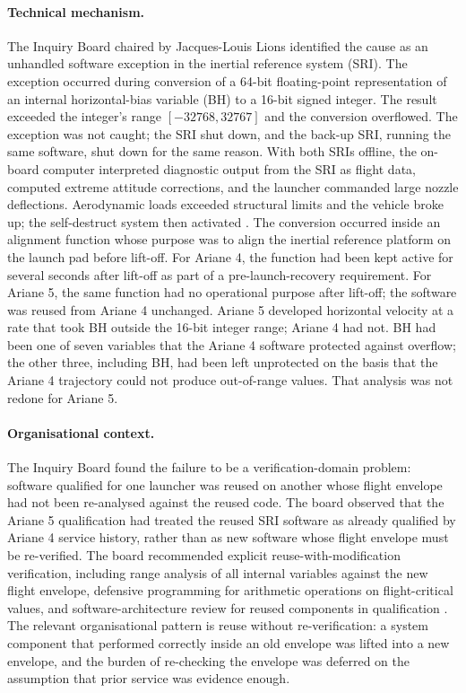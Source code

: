\paragraph{Technical mechanism.}
The Inquiry Board chaired by Jacques-Louis Lions identified the
cause as an unhandled software exception in the inertial reference
system (SRI). The exception occurred during conversion of a 64-bit
floating-point representation of an internal horizontal-bias
variable (BH) to a 16-bit signed integer. The result exceeded the
integer's range $[-32768, 32767]$ and the conversion overflowed. The
exception was not caught; the SRI shut down, and the back-up SRI,
running the same software, shut down for the same reason. With both
SRIs offline, the on-board computer interpreted diagnostic output
from the SRI as flight data, computed extreme attitude corrections,
and the launcher commanded large nozzle deflections. Aerodynamic
loads exceeded structural limits and the vehicle broke up; the
self-destruct system then activated \cite{acc:ariane501-ifr}. The
conversion occurred inside an alignment function whose purpose was
to align the inertial reference platform on the launch pad before
lift-off. For Ariane 4, the function had been kept active for
several seconds after lift-off as part of a pre-launch-recovery
requirement. For Ariane 5, the same function had no operational
purpose after lift-off; the software was reused from Ariane 4
unchanged. Ariane 5 developed horizontal velocity at a rate that
took BH outside the 16-bit integer range; Ariane 4 had not. BH had
been one of seven variables that the Ariane 4 software protected
against overflow; the other three, including BH, had been left
unprotected on the basis that the Ariane 4 trajectory could not
produce out-of-range values. That analysis was not redone for Ariane
5.

\paragraph{Organisational context.}
The Inquiry Board found the failure to be a verification-domain
problem: software qualified for one launcher was reused on another
whose flight envelope had not been re-analysed against the reused
code. The board observed that the Ariane 5 qualification had treated
the reused SRI software as already qualified by Ariane 4 service
history, rather than as new software whose flight envelope must be
re-verified. The board recommended explicit reuse-with-modification
verification, including range analysis of all internal variables
against the new flight envelope, defensive programming for arithmetic
operations on flight-critical values, and software-architecture
review for reused components in qualification \cite{acc:ariane501-ifr}.
The relevant organisational pattern is reuse without re-verification:
a system component that performed correctly inside an old envelope
was lifted into a new envelope, and the burden of re-checking the
envelope was deferred on the assumption that prior service was
evidence enough.

